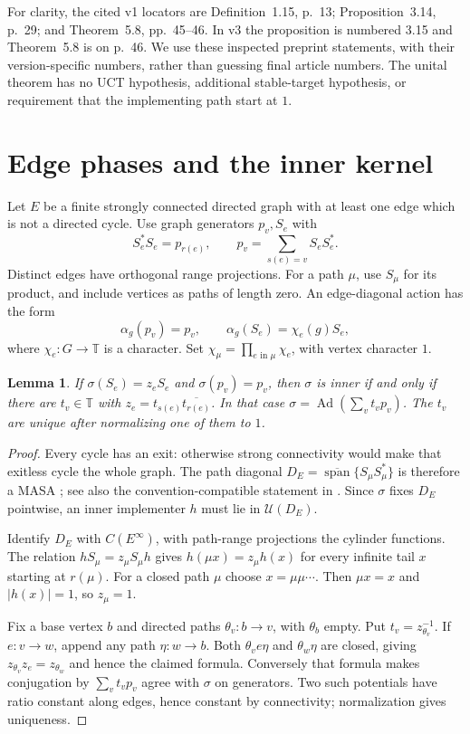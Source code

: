 \documentclass[11pt,a4paper]{article}
\newtheorem{lemma}[theorem]{Lemma}
\theoremstyle{definition}
\newcommand{\Ad}{\operatorname{Ad}}
\newcommand{\U}{\mathcal U}
\newcommand{\T}{\mathbb T}
\begin{document}
For clarity, the cited v1 locators are Definition~1.15, p.~13;
Proposition~3.14, p.~29; and Theorem~5.8, pp.~45--46. In v3 the proposition
is numbered 3.15 and Theorem~5.8 is on p.~46. We use these inspected
preprint statements, with their version-specific numbers, rather than
guessing final article numbers. The unital theorem has no UCT hypothesis,
additional stable-target hypothesis, or requirement that the implementing
path start at $1$.

\section{Edge phases and the inner kernel}

Let $E$ be a finite strongly connected directed graph with at least one
edge which is not a directed cycle. Use graph generators $p_v,S_e$ with
\[
 S_e^*S_e=p_{r(e)},\qquad
 p_v=\sum_{s(e)=v}S_eS_e^*.
\]
Distinct edges have orthogonal range projections. For a path $\mu$, use
$S_\mu$ for its product, and include vertices as paths of length zero.
An edge-diagonal action has the form
\[
 \alpha_g(p_v)=p_v,\qquad \alpha_g(S_e)=\chi_e(g)S_e,
\]
where $\chi_e:G\to\T$ is a character. Set
$\chi_\mu=\prod_{e\text{ in }\mu}\chi_e$, with vertex character $1$.

\begin{lemma}\label{lem:inner}
If $\sigma(S_e)=z_eS_e$ and $\sigma(p_v)=p_v$, then $\sigma$ is inner
if and only if there are $t_v\in\T$ with
$z_e=t_{s(e)}\overline{t_{r(e)}}$. In that case
$\sigma=\Ad(\sum_vt_vp_v)$. The $t_v$ are unique after normalizing one of
them to $1$.
\end{lemma}
\begin{proof}
Every cycle has an exit: otherwise strong connectivity would make that
exitless cycle the whole graph. The path diagonal
$D_E=\overline{\operatorname{span}}\{S_\mu S_\mu^*\}$ is therefore a
MASA \cite[Theorem~5.2]{HPP}; see also the convention-compatible statement
in \cite[\S2.1]{CHS}. Since $\sigma$ fixes $D_E$ pointwise, an inner
implementer $h$ must lie in $\U(D_E)$.

Identify $D_E$ with $C(E^\infty)$, with path-range projections the cylinder
functions. The relation $hS_\mu=z_\mu S_\mu h$ gives
$h(\mu x)=z_\mu h(x)$ for every infinite tail $x$ starting at $r(\mu)$.
For a closed path $\mu$ choose $x=\mu\mu\cdots$. Then $\mu x=x$ and
$|h(x)|=1$, so $z_\mu=1$.

Fix a base vertex $b$ and directed paths $\theta_v:b\to v$, with
$\theta_b$ empty. Put $t_v=z_{\theta_v}^{-1}$. If $e:v\to w$, append
any path $\eta:w\to b$. Both $\theta_v e\eta$ and $\theta_w\eta$ are
closed, giving $z_{\theta_v}z_e=z_{\theta_w}$ and hence the claimed
formula. Conversely that formula makes conjugation by $\sum_vt_vp_v$
agree with $\sigma$ on generators. Two such potentials have ratio
constant along edges, hence constant by connectivity; normalization gives
uniqueness.
\end{proof}
\end{document}
